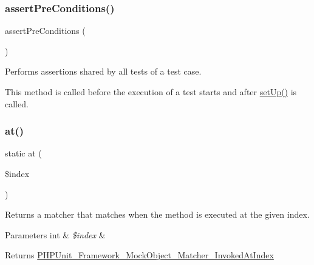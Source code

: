 \subsubsection{\texorpdfstring{assert\+Pre\+Conditions()}{assertPreConditions()}}
{\footnotesize\ttfamily assert\+Pre\+Conditions (\begin{DoxyParamCaption}{ }\end{DoxyParamCaption})\hspace{0.3cm}{\ttfamily [protected]}}

Performs assertions shared by all tests of a test case.

This method is called before the execution of a test starts and after \mbox{\hyperlink{class_p_h_p_unit___framework___test_case_a0bc688732d2b3b162ffebaf7812e78da}{set\+Up()}} is called. \mbox{\label{class_p_h_p_unit___framework___test_case_ac735019234bfd368eb87cae030d77593}} 
\subsubsection{\texorpdfstring{at()}{at()}}
{\footnotesize\ttfamily static at (\begin{DoxyParamCaption}\item[{}]{\$index }\end{DoxyParamCaption})\hspace{0.3cm}{\ttfamily [static]}}

Returns a matcher that matches when the method is executed at the given index.


\begin{DoxyParams}[1]{Parameters}
int & {\em \$index} & \\
\hline
\end{DoxyParams}
\begin{DoxyReturn}{Returns}
\mbox{\hyperlink{class_p_h_p_unit___framework___mock_object___matcher___invoked_at_index}{P\+H\+P\+Unit\+\_\+\+Framework\+\_\+\+Mock\+Object\+\_\+\+Matcher\+\_\+\+Invoked\+At\+Index}} 
\end{DoxyReturn}
\mbox{\label{class_p_h_p_unit___framework___test_case_ac9adbbd8ea3a417a40d8a37f15876e33}} 
